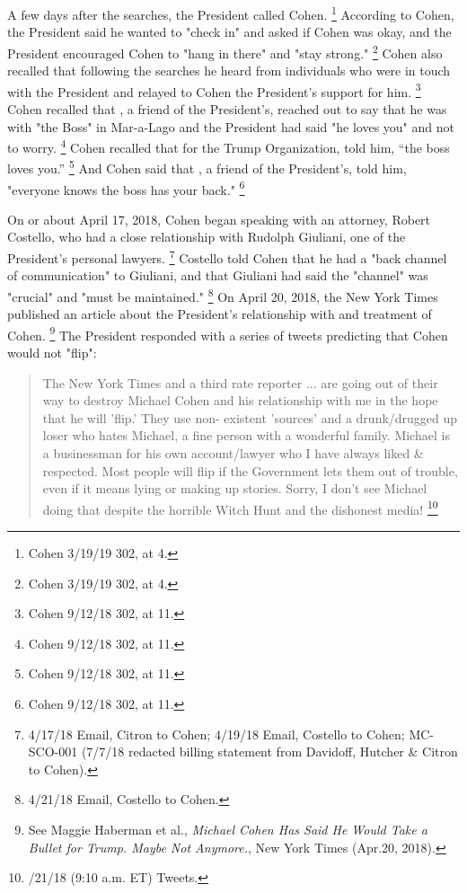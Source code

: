 A few days after the searches, the President called Cohen.%
\footnote{Cohen 3/19/19 302, at 4.}
According to Cohen, the President said he wanted to "check in" and asked if Cohen was okay, and the President encouraged Cohen to "hang in there" and "stay strong."%
\footnote{Cohen 3/19/19 302, at 4.}
Cohen also recalled that following the searches he heard from individuals who were in touch with the President and relayed to Cohen the President's support for him.%
\footnote{Cohen 9/12/18 302, at 11.}
Cohen recalled that , a friend of the President's, reached out to say that he was with "the Boss" in Mar-a-Lago and the President had said "he loves you" and not to worry.%
\footnote{Cohen 9/12/18 302, at 11.}
Cohen recalled that  for the Trump Organization, told him, ``the boss loves you.''%
\footnote{Cohen 9/12/18 302, at 11.}
And Cohen said that , a friend of the President's, told him, "everyone knows the boss has your back."%
\footnote{Cohen 9/12/18 302, at 11.}

On or about April 17, 2018, Cohen began speaking with an attorney, Robert Costello, who had a close relationship with Rudolph Giuliani, one of the President's personal lawyers.%
\footnote{4/17/18 Email, Citron to Cohen;
4/19/18 Email, Costello to Cohen;
MC-SCO-001 (7/7/18 redacted billing statement from Davidoff, Hutcher \& Citron to Cohen).}
Costello told Cohen that he had a "back channel of communication" to Giuliani, and that Giuliani had said the "channel" was "crucial" and "must be maintained."%
\footnote{4/21/18 Email, Costello to Cohen.}
On April 20, 2018, the New York Times published an article about the President's relationship with and treatment of Cohen.%
\footnote{See Maggie Haberman et al., \textit{Michael Cohen Has Said He Would Take a Bullet for Trump. Maybe Not Anymore.}, New York Times (Apr.20, 2018).}
The President responded with a series of tweets predicting that Cohen would not "flip":

\begin{quote}
The New York Times and a third rate reporter ... are going out of their way to destroy Michael Cohen and his relationship with me in the hope that he will 'flip.'
They use non- existent 'sources' and a drunk/drugged up loser who hates Michael, a fine person with a wonderful family.
Michael is a businessman for his own account/lawyer who I have always liked \& respected.
Most people will flip if the Government lets them out of trouble, even if it means lying or making up stories.
Sorry, I don't see Michael doing that despite the horrible Witch Hunt and the dishonest media!%
\footnote{/21/18 (9:10 a.m. ET) Tweets.}
\end{quote}

